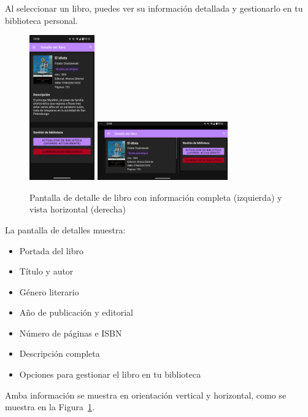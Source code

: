 \documentclass[a4paper,10pt]{report}
\begin{document}
      Al seleccionar un libro, puedes ver su información detallada y gestionarlo en tu biblioteca personal.
    
      \begin{figure}[H]
        \centering
        \includegraphics[width=0.25\textwidth]{.img/libro.png}
        \hspace{1cm}
        \includegraphics[width=0.5\textwidth]{.img/libro-land.png}
        \caption{Pantalla de detalle de libro con información completa (izquierda) y vista horizontal (derecha)}
        \label{fig:libro}
      \end{figure}
      
      La pantalla de detalles muestra:
      \begin{itemize}
        \item Portada del libro
        \item Título y autor
        \item Género literario
        \item Año de publicación y editorial
        \item Número de páginas e ISBN
        \item Descripción completa
        \item Opciones para gestionar el libro en tu biblioteca
      \end{itemize}
      Amba información se muestra en orientación vertical y horizontal, como se muestra en la Figura~\ref{fig:libro}.
    
    
\end{document}
